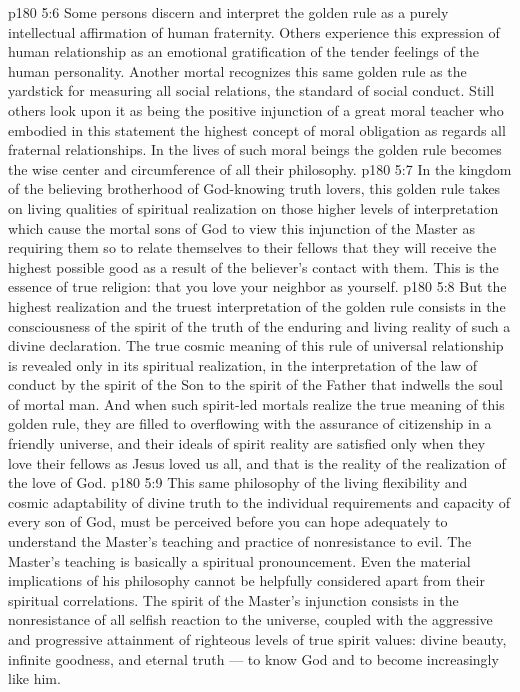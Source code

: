 \vs p180 5:6 Some persons discern and interpret the golden rule as a purely intellectual affirmation of human fraternity. Others experience this expression of human relationship as an emotional gratification of the tender feelings of the human personality. Another mortal recognizes this same golden rule as the yardstick for measuring all social relations, the standard of social conduct. Still others look upon it as being the positive injunction of a great moral teacher who embodied in this statement the highest concept of moral obligation as regards all fraternal relationships. In the lives of such moral beings the golden rule becomes the wise center and circumference of all their philosophy.
\vs p180 5:7 In the kingdom of the believing brotherhood of God\hyp{}knowing truth lovers, this golden rule takes on living qualities of spiritual realization on those higher levels of interpretation which cause the mortal sons of God to view this injunction of the Master as requiring them so to relate themselves to their fellows that they will receive the highest possible good as a result of the believer’s contact with them. This is the essence of true religion: that you love your neighbor as yourself.
\vs p180 5:8 But the highest realization and the truest interpretation of the golden rule consists in the consciousness of the spirit of the truth of the enduring and living reality of such a divine declaration. The true cosmic meaning of this rule of universal relationship is revealed only in its spiritual realization, in the interpretation of the law of conduct by the spirit of the Son to the spirit of the Father that indwells the soul of mortal man. And when such spirit\hyp{}led mortals realize the true meaning of this golden rule, they are filled to overflowing with the assurance of citizenship in a friendly universe, and their ideals of spirit reality are satisfied only when they love their fellows as Jesus loved us all, and that is the reality of the realization of the love of God.
\vs p180 5:9 This same philosophy of the living flexibility and cosmic adaptability of divine truth to the individual requirements and capacity of every son of God, must be perceived before you can hope adequately to understand the Master’s teaching and practice of nonresistance to evil. The Master’s teaching is basically a spiritual pronouncement. Even the material implications of his philosophy cannot be helpfully considered apart from their spiritual correlations. The spirit of the Master’s injunction consists in the nonresistance of all selfish reaction to the universe, coupled with the aggressive and progressive attainment of righteous levels of true spirit values: divine beauty, infinite goodness, and eternal truth --- to know God and to become increasingly like him.
